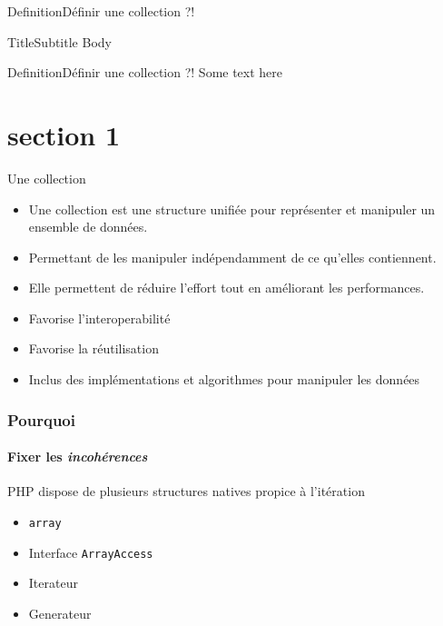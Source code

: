 





\begin{frame}[plain]
	\titlepage{}
\end{frame}

%
%

\begin{frameD}{Definition}{Définir une collection ?!}
\end{frameD}

\begin{frameA}{Title}{Subtitle}
Body
\end{frameA}

\begin{frameB}{Definition}{Définir une collection ?!}
Some text here
\end{frameB}

\section{section 1}
\begin{frame}{Une collection}
    \begin{itemize}
        \item Une collection est une structure unifiée pour représenter et manipuler un ensemble de données.
        \item Permettant de les manipuler indépendamment de ce qu'elles contiennent.
        \item Elle permettent de réduire l'effort tout en améliorant les performances\footnotemark.
        \item Favorise l'interoperabilité
        \item Favorise la réutilisation
        \item Inclus des implémentations et algorithmes pour manipuler les données
    \end{itemize}

\end{frame}

\begin{frame}
	\frametitle{Pourquoi}
    \framesubtitle{Fixer les \textit{incohérences}}

    PHP dispose de plusieurs structures natives propice à l'itération

    \begin{itemize}[<+->]
        \item \texttt{array}
        \item Interface \texttt{ArrayAccess}
        \item Iterateur
        \item Generateur
    \end{itemize}
\end{frame}


